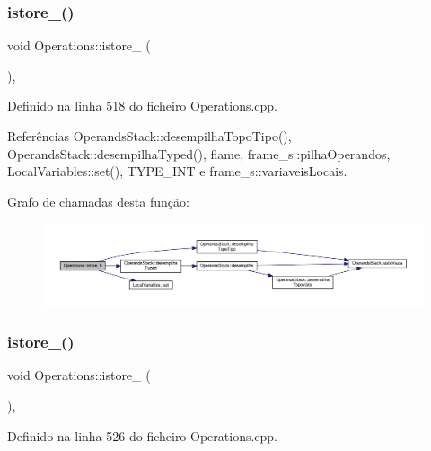 \subsubsection{\texorpdfstring{istore\+\_()}{istore\_0()}}
{\footnotesize\ttfamily void Operations\+::istore\+\_ (\begin{DoxyParamCaption}{ }\end{DoxyParamCaption})\hspace{0.3cm}{\ttfamily [static]}, {\ttfamily [private]}}



Definido na linha 518 do ficheiro Operations.\+cpp.



Referências Operands\+Stack\+::desempilha\+Topo\+Tipo(), Operands\+Stack\+::desempilha\+Typed(), flame, frame\+\_\+s\+::pilha\+Operandos, Local\+Variables\+::set(), T\+Y\+P\+E\+\_\+\+I\+NT e frame\+\_\+s\+::variaveis\+Locais.

Grafo de chamadas desta função\+:
\nopagebreak
\begin{figure}[H]
\begin{center}
\leavevmode
\includegraphics[width=350pt]{classOperations_ae0a17c510b570467f5b025e3dcbe1398_cgraph}
\end{center}
\end{figure}
\mbox{\label{classOperations_aeb89677195b16d5c595ec9faaddc2c76}} 
\subsubsection{\texorpdfstring{istore\+\_()}{istore\_1()}}
{\footnotesize\ttfamily void Operations\+::istore\+\_ (\begin{DoxyParamCaption}{ }\end{DoxyParamCaption})\hspace{0.3cm}{\ttfamily [static]}, {\ttfamily [private]}}



Definido na linha 526 do ficheiro Operations.\+cpp.



